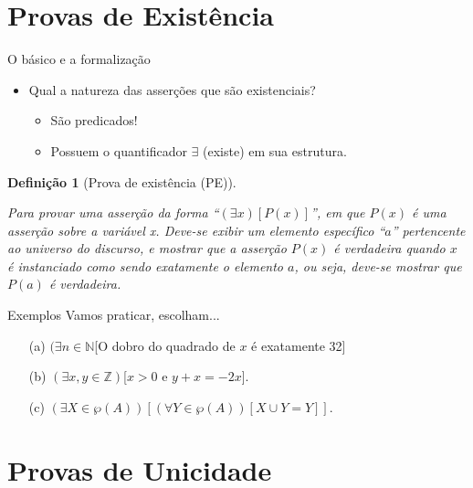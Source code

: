 \documentclass[aspectratio=169]{beamer}
\newtheorem{defi}{Definição}
\begin{document}
	\section{Provas de Existência}
	
	\begin{frame}{O básico e a formalização}
		\begin{itemize}
			\item Qual a natureza das asserções que são existenciais?\pause
			\begin{itemize}
				\item São predicados!
				\item Possuem o quantificador $\exists$ (existe) em sua estrutura.
			\end{itemize} 
		\end{itemize}
		\pause
		\begin{defi}[Prova de existência (PE)]
			\
			
			Para provar uma asserção da forma ``$(\exists x)[P(x)]$'', em que $P(x)$ é uma asserção sobre a variável x. Deve-se exibir um elemento específico ``$a$'' pertencente ao universo do discurso, e mostrar que a asserção $P(x)$ é verdadeira quando $x$ é instanciado como sendo exatamente o elemento $a$, ou seja, deve-se mostrar que $P(a)$ é verdadeira.
		\end{defi}
	\end{frame}

	\begin{frame}{Exemplos}
		Vamos praticar, escolham...
		\begin{itemize}
			\item[(a)] $(\exists n \in \mathbb{N}$[O dobro do quadrado de $x$ é exatamente 32]
			\item[(b)] $(\exists  x, y \in \mathbb{Z})$[$x > 0$ e $y + x = -2x$].
			\item[(c)] $(\exists X \in \wp(A))[(\forall Y \in \wp(A))[X \cup Y = Y]]$.
		\end{itemize}
	\end{frame}
	
	\section{Provas de Unicidade}
	
\end{document}
